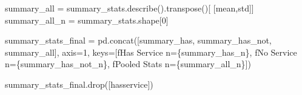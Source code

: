\documentclass[
]{article}
\newenvironment{Shaded}{\begin{snugshade}}{\end{snugshade}}
\newcommand{\DecValTok}[1]{\textcolor[rgb]{0.68,0.00,0.00}{#1}}
\newcommand{\NormalTok}[1]{\textcolor[rgb]{0.00,0.23,0.31}{#1}}
\newcommand{\OperatorTok}[1]{\textcolor[rgb]{0.37,0.37,0.37}{#1}}
\newcommand{\SpecialCharTok}[1]{\textcolor[rgb]{0.37,0.37,0.37}{#1}}
\newcommand{\SpecialStringTok}[1]{\textcolor[rgb]{0.13,0.47,0.30}{#1}}
\newcommand{\StringTok}[1]{\textcolor[rgb]{0.13,0.47,0.30}{#1}}
\begin{document}
\begin{Shaded}
\begin{Highlighting}[]
\NormalTok{summary\_all }\OperatorTok{=}\NormalTok{ summary\_stats.describe().transpose()[}
\NormalTok{    [}\StringTok{\textquotesingle{}mean\textquotesingle{}}\NormalTok{,}\StringTok{\textquotesingle{}std\textquotesingle{}}\NormalTok{]]}
\NormalTok{summary\_all\_n }\OperatorTok{=}\NormalTok{ summary\_stats.shape[}\DecValTok{0}\NormalTok{]}

\NormalTok{summary\_stats\_final }\OperatorTok{=}\NormalTok{ pd.concat([summary\_has, summary\_has\_not, }
\NormalTok{           summary\_all], axis}\OperatorTok{=}\DecValTok{1}\NormalTok{, }
\NormalTok{           keys}\OperatorTok{=}\NormalTok{[}\SpecialStringTok{f\textquotesingle{}Has Service n=}\SpecialCharTok{\{}\NormalTok{summary\_has\_n}\SpecialCharTok{\}}\SpecialStringTok{\textquotesingle{}}\NormalTok{,}
                 \SpecialStringTok{f\textquotesingle{}No Service n=}\SpecialCharTok{\{}\NormalTok{summary\_has\_not\_n}\SpecialCharTok{\}}\SpecialStringTok{\textquotesingle{}}\NormalTok{,}
                 \SpecialStringTok{f\textquotesingle{}Pooled Stats n=}\SpecialCharTok{\{}\NormalTok{summary\_all\_n}\SpecialCharTok{\}}\SpecialStringTok{\textquotesingle{}}\NormalTok{])}

\NormalTok{summary\_stats\_final.drop([}\StringTok{\textquotesingle{}hasservice\textquotesingle{}}\NormalTok{])}
\end{Highlighting}
\end{Shaded}
\end{document}
